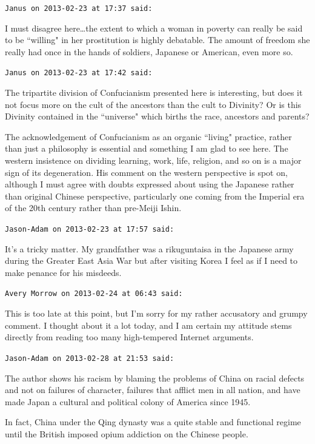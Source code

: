 \begin{footnotesize}
\begin{sffamily}
\hfill

\texttt{Janus on 2013-02-23 at 17:37 said: }

I must disagree here…the extent to which a woman in poverty can really be said to be ``willing" in her prostitution is highly debatable. The amount of freedom she really had once in the hands of soldiers, Japanese or American, even more so.


\hfill

\texttt{Janus on 2013-02-23 at 17:42 said: }

The tripartite division of Confucianism presented here is interesting, but does it not focus more on the cult of the ancestors than the cult to Divinity? Or is this Divinity contained in the ``universe" which births the race, ancestors and parents?

The acknowledgement of Confucianism as an organic ``living" practice, rather than just a philosophy is essential and something I am glad to see here. The western insistence on dividing learning, work, life, religion, and so on is a major sign of its degeneration. His comment on the western perspective is spot on, although I must agree with doubts expressed about using the Japanese rather than original Chinese perspective, particularly one coming from the Imperial era of the 20th century rather than pre-Meiji Ishin.


\hfill

\texttt{Jason-Adam on 2013-02-23 at 17:57 said: }

It's a tricky matter. My grandfather was a rikuguntaisa in the Japanese army during the Greater East Asia War but after visiting Korea I feel as if I need to make penance for his misdeeds.


\hfill

\texttt{Avery Morrow on 2013-02-24 at 06:43 said: }

This is too late at this point, but I'm sorry for my rather accusatory and grumpy comment. I thought about it a lot today, and I am certain my attitude stems directly from reading too many high-tempered Internet arguments.


\hfill

\texttt{Jason-Adam on 2013-02-28 at 21:53 said: }

The author shows his racism by blaming the problems of China on racial defects and not on failures of character, failures that afflict men in all nation, and have made Japan a cultural and political colony of America since 1945.

In fact, China under the Qing dynasty was a quite stable and functional regime until the British imposed opium addiction on the Chinese people.


\end{sffamily}
\end{footnotesize}
